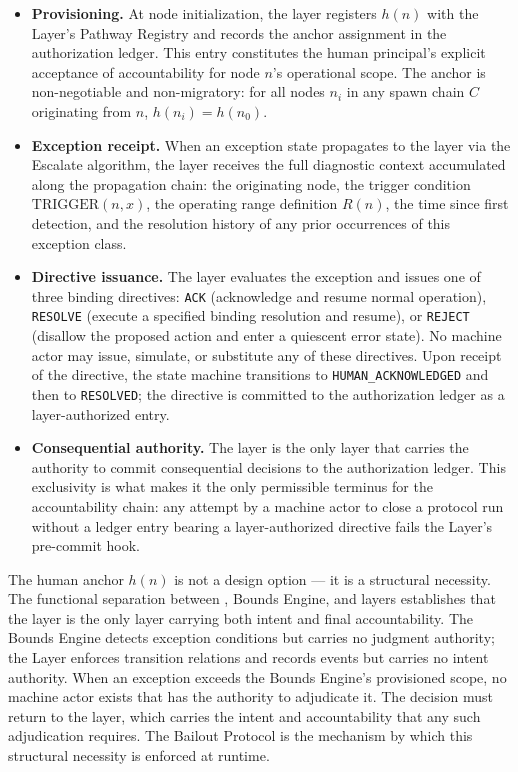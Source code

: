 \begin{itemize}\itemsep=0pt
\item[(\textit{i})] \textbf{Provisioning.} At node initialization, the \purpose{} layer registers $h(n)$ with the \fact{} Layer's Pathway Registry and records the anchor assignment in the authorization ledger. This entry constitutes the human principal's explicit acceptance of accountability for node $n$'s operational scope. The anchor is non-negotiable and non-migratory: for all nodes $n_i$ in any spawn chain $C$ originating from $n$, $h(n_i) = h(n_0)$.

\item[(\textit{ii})] \textbf{Exception receipt.} When an exception state propagates to the \purpose{} layer via the Escalate algorithm, the \purpose{} layer receives the full diagnostic context accumulated along the propagation chain: the originating node, the trigger condition $\text{TRIGGER}(n, x)$, the operating range definition $R(n)$, the time since first detection, and the resolution history of any prior occurrences of this exception class.

\item[(\textit{iii})] \textbf{Directive issuance.} The \purpose{} layer evaluates the exception and issues one of three binding directives: \texttt{ACK} (acknowledge and resume normal operation), \texttt{RESOLVE} (execute a specified binding resolution and resume), or \texttt{REJECT} (disallow the proposed action and enter a quiescent error state). No machine actor may issue, simulate, or substitute any of these directives. Upon receipt of the directive, the state machine transitions to \texttt{HUMAN\_ACKNOWLEDGED} and then to \texttt{RESOLVED}; the directive is committed to the authorization ledger as a \purpose layer-authorized entry.

\item[(\textit{iv})] \textbf{Consequential authority.} The \purpose{} layer is the only layer that carries the authority to commit consequential decisions to the authorization ledger. This exclusivity is what makes it the only permissible terminus for the accountability chain: any attempt by a machine actor to close a protocol run without a ledger entry bearing a \purpose layer-authorized directive fails the \fact{} Layer's pre-commit hook.
\end{itemize}

The human anchor $h(n)$ is not a design option --- it is a structural necessity. The functional separation between \purpose{}, Bounds Engine, and \fact{} layers establishes that the \purpose{} layer is the only layer carrying both intent and final accountability. The Bounds Engine detects exception conditions but carries no judgment authority; the \fact{} Layer enforces transition relations and records events but carries no intent authority. When an exception exceeds the Bounds Engine's provisioned scope, no machine actor exists that has the authority to adjudicate it. The decision must return to the \purpose{} layer, which carries the intent and accountability that any such adjudication requires. The Bailout Protocol is the mechanism by which this structural necessity is enforced at runtime.

